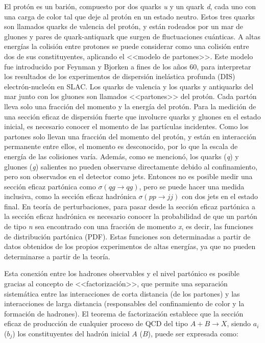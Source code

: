 El protón es un barión, compuesto por dos quarks \textit{u} y un quark \textit{d}, cada uno con una carga de color tal que deje al protón en un estado neutro. Estos tres quarks son llamados quarks de valencia del protón, y están rodeados por un mar de gluones y pares de quark-antiquark que surgen de fluctuaciones cuánticas. A altas energías la colisión entre protones se puede considerar como una colisión entre dos de sus constituyentes, aplicando el <<modelo de partones>>. Este modelo fue introducido por Feynman \cite{PhysRevLett.23.1415} y Bjorken \cite{PhysRev.185.1975} a fines de los años 60, para interpretar los resultados de los experimentos de dispersión inelástica profunda (DIS) electrón-nucleón en SLAC. Los quarks de valencia y los quarks y antiquarks del mar junto con los gluones son llamados <<partones>> del protón. Cada partón lleva solo una fracción del momento y la energía del protón. Para la medición de una sección eficaz de dispersión fuerte que involucre quarks y gluones en el estado inicial, es necesario conocer el momento de las partículas incidentes. Como los partones solo llevan una fracción del momento del protón, y están en interacción permanente entre ellos, el momento es desconocido, por lo que la escala de energía de las colisiones varía. Además, como se mencionó, los quarks (\textit{q}) y gluones (\textit{g}) salientes no pueden observarse directamente debido al confinamiento, pero son observados en el detector como jets. Entonces no es posible medir una sección eficaz partónica como $\sigma(qg \rightarrow qg)$, pero se puede hacer una medida inclusiva, como la sección eficaz hadrónica $\sigma(pp \rightarrow jj)$ con dos jets en el estado final. En teoría de perturbaciones, para pasar desde la sección eficaz partónica a la sección eficaz hadrónica es necesario conocer la probabilidad de que un partón de tipo \textit{n} sea encontrado con una fracción de momento \textit{x}, es decir, las funciones de distribución partónica (PDF). Estas funciones son determinadas a partir de datos obtenidos de los propios experimentos de altas energías, ya que no pueden determinarse a partir de la teoría. 

Esta conexión entre los hadrones observables y el nivel partónico es posible gracias al concepto de <<factorización>>, que permite una separación sistemática entre las interacciones de corta distancia (de los partones) y las interacciones de larga distancia (responsables del confinamiento de color y la formación de hadrones). El teorema de factorización \cite{ELLIS1978281} establece que la sección eficaz de producción de cualquier proceso de QCD del tipo $A + B \rightarrow X$, siendo $a_{i}$ ($b_{j}$) los constituyentes del hadrón inicial $A$ ($B$), puede ser expresada como: 

